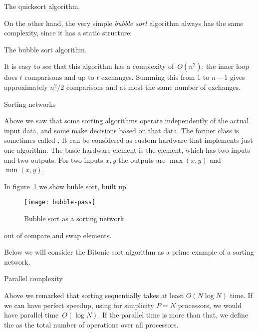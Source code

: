 \begin{displayalgorithm}
  \caption{The quicksort algorithm.}
\end{displayalgorithm}

On the other hand, the very simple \emph{bubble
  sort} algorithm
always has the same complexity, since it has a static structure:

\begin{displayalgorithm}
  \caption{The bubble sort algorithm.}
\end{displayalgorithm}

It is easy to see that this algorithm has a complexity of~$O(n^2)$:
the inner loop does $t$ comparisons and up to $t$ exchanges. Summing
this from $1$ to $n-1$ gives approximately $n^2/2$ comparisons and
at most the same number of exchanges.

 {Sorting networks}

Above we saw that some sorting algorithms operate independently of the
actual input data, and some make decisions based on that data.
The former class is sometimes
called . It can be considered
as custom hardware that implements just one algorithm. The 
basic hardware element is the 
element, which has two inputs and two outputs. For two inputs $x,y$
the outputs are $\max(x,y)$ and $\min(x,y)$.

In figure~\ref{fig:bubble-pass} we show buble sort, built up
%
\begin{figure}[ht]
  \texttt{[image: bubble-pass]}
  \caption{Bubble sort as a sorting network.}
  \label{fig:bubble-pass}
\end{figure}
%
out of compare and swap elements.

Below we will consider the Bitonic sort algorithm
as a prime example of a sorting network.

 {Parallel complexity}

Above we remarked that sorting sequentially takes at least $O(N\log N)$ time.
If we can have perfect speedup, using for simplicity $P=N$ processors,
we would have parallel time~$O(\log N)$. If the parallel time
is more than that, we define the
%
as the total number of operations over all processors.

